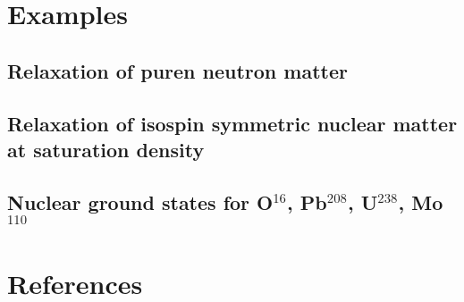 \documentclass[4p]{elsarticle}
\begin{document}
\section{Examples}
\subsection{Relaxation of puren neutron matter}
\subsection{Relaxation of isospin symmetric nuclear matter at saturation density}
\subsection{Nuclear ground states for O$^{16}$, Pb$^{208}$, U$^{238}$, Mo$^{110}$}

\section*{References}


\end{document}
